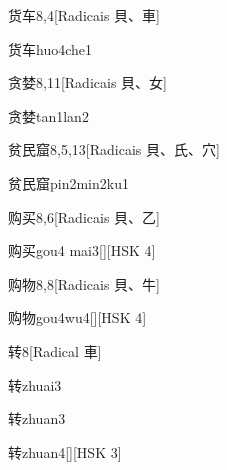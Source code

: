 \begin{entry}{货车}{8,4}[Radicais ⾙、⾞]
  \begin{phonetics}{货车}{huo4che1}
  \end{phonetics}
\end{entry}

\begin{entry}{贪婪}{8,11}[Radicais ⾙、⼥]
  \begin{phonetics}{贪婪}{tan1lan2}
  \end{phonetics}
\end{entry}

\begin{entry}{贫民窟}{8,5,13}[Radicais ⾙、⽒、⽳]
  \begin{phonetics}{贫民窟}{pin2min2ku1}
  \end{phonetics}
\end{entry}

\begin{entry}{购买}{8,6}[Radicais ⾙、⼄]
  \begin{phonetics}{购买}{gou4 mai3}[][HSK 4]
  \end{phonetics}
\end{entry}

\begin{entry}{购物}{8,8}[Radicais ⾙、⽜]
  \begin{phonetics}{购物}{gou4wu4}[][HSK 4]
  \end{phonetics}
\end{entry}

\begin{entry}{转}{8}[Radical ⾞]
  \begin{phonetics}{转}{zhuai3}
  \end{phonetics}
  \begin{phonetics}{转}{zhuan3}
  \end{phonetics}
  \begin{phonetics}{转}{zhuan4}[][HSK 3]
  \end{phonetics}
\end{entry}

